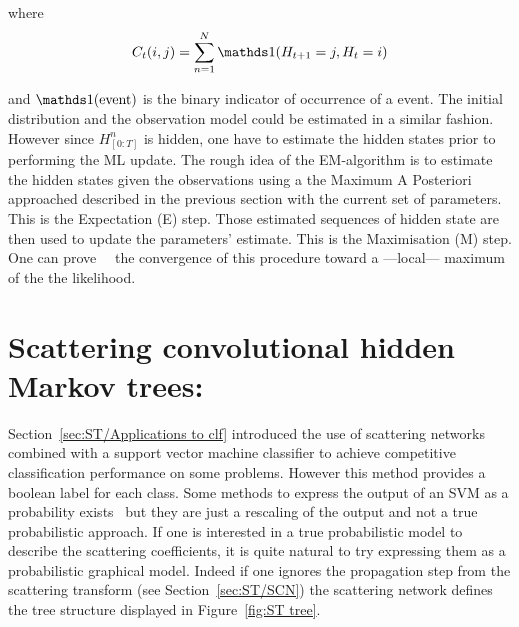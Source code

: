\documentclass[a4paper,11pt]{report}
\begin{document}
      where 
      \begin{equation}
        C_{t}(i,j) = \sum_{n=1}^{N} \ds1(H_{t+1}=j, H_{t}=i)
        \label{eq:EM intuit transition count}
      \end{equation}
      
      and $\ds1(\text{event})$ is the binary indicator of occurrence of a event. The initial distribution and the observation model could be estimated in a similar fashion.\\
      
      However since $H_{[0:T]}^{n}$ is hidden, one have to estimate the hidden states prior to performing the ML update. The rough idea of the EM-algorithm is to estimate the hidden states given the observations using a the Maximum A Posteriori approached described in the previous section with the current set of parameters. This is the Expectation (E) step. Those estimated sequences of hidden state are then used to update the parameters' estimate. This is the Maximisation (M) step.\\
      
      One can prove~\citep{baum1970maximization}~\citep{dempster1977maximum} the convergence of this procedure toward a ---local--- maximum of the the likelihood.
      
      
\chapter{Scattering convolutional hidden Markov trees:}
  \label{chap:SCHMT}
  Section~\ref{sec:ST/Applications to clf} introduced the use of scattering networks combined with a support vector machine classifier to achieve competitive classification performance on some problems. However this method provides a boolean label for each class. Some methods to express the output of an SVM as a probability exists~\citep{platt1999probabilistic} but they are just a rescaling of the output and not a true probabilistic approach. If one is interested in a true probabilistic model to describe the scattering coefficients, it is quite natural to try expressing them as a probabilistic graphical model. Indeed if one ignores the propagation step from the scattering transform (see Section~\ref{sec:ST/SCN}) the scattering network defines the tree structure displayed in Figure~\ref{fig:ST tree}. \\
\end{document}
